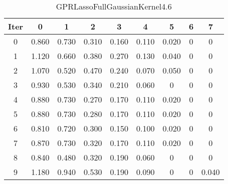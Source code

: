 \begin{table}
	\begin{center}
		\begin{tabular}{|c|c|c|c|c|c|c|c|c|}
			\hline
			Iter & 0 & 1 & 2 & 3 & 4 & 5 & 6 & 7 \\
			\hline
			0 & 0.860 & 0.730 & 0.310 & 0.160 & 0.110 & 0.020 & 0 & 0 \\
			\hline
			1 & 1.120 & 0.660 & 0.380 & 0.270 & 0.130 & 0.040 & 0 & 0 \\
			\hline
			2 & 1.070 & 0.520 & 0.470 & 0.240 & 0.070 & 0.050 & 0 & 0 \\
			\hline
			3 & 0.930 & 0.530 & 0.340 & 0.210 & 0.060 & 0 & 0 & 0 \\
			\hline
			4 & 0.880 & 0.730 & 0.270 & 0.170 & 0.110 & 0.020 & 0 & 0 \\
			\hline
			5 & 0.880 & 0.730 & 0.280 & 0.170 & 0.110 & 0.020 & 0 & 0 \\
			\hline
			6 & 0.810 & 0.720 & 0.300 & 0.150 & 0.100 & 0.020 & 0 & 0 \\
			\hline
			7 & 0.870 & 0.730 & 0.320 & 0.170 & 0.110 & 0.020 & 0 & 0 \\
			\hline
			8 & 0.840 & 0.480 & 0.320 & 0.190 & 0.060 & 0 & 0 & 0 \\
			\hline
			9 & 1.180 & 0.940 & 0.530 & 0.190 & 0.090 & 0 & 0 & 0.040 \\
			\hline
		\end{tabular}
	\end{center}
	\caption{GPRLassoFullGaussianKernel4.6}
\end{table}
